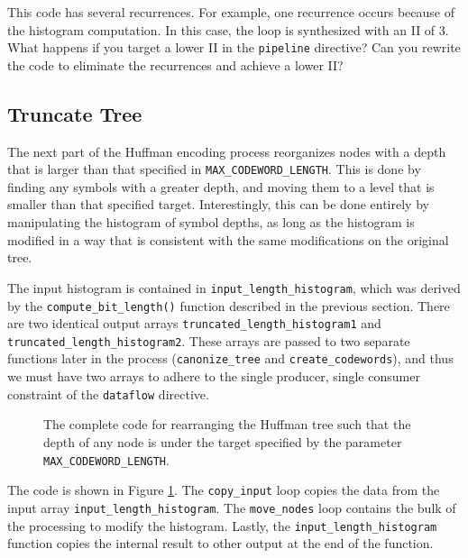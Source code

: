 \begin{exercise}
This code has several recurrences.  For example, one recurrence occurs because of the histogram computation.  In this case, the loop is synthesized with an II of 3.  What happens if you target a lower II in the \lstinline{pipeline} directive?  Can you rewrite the code to eliminate the recurrences and achieve a lower II?
\end{exercise}

\subsection{Truncate Tree}
\label{sec:huffman_truncate_tree}

The next part of the Huffman encoding process reorganizes nodes with a depth that is larger than that specified in \lstinline{MAX_CODEWORD_LENGTH}. This is done by finding any symbols with a greater depth, and moving them to a level that is smaller than that specified target.   Interestingly, this can be done entirely by manipulating the histogram of symbol depths, as long as the histogram is modified in a way that is consistent with the same modifications on the original tree.


The input histogram is contained in \lstinline{input_length_histogram}, which was derived by the \lstinline{compute_bit_length()} function described in the previous section. There are two identical output arrays \lstinline{truncated_length_histogram1} and \lstinline{truncated_length_histogram2}. These arrays are passed to two separate functions later in the process (\lstinline{canonize_tree} and \lstinline{create_codewords}), and thus we must have two arrays to adhere to the single producer, single consumer constraint of the \lstinline{dataflow} directive.

\begin{figure}

\end{figure}
\begin{figure}

\caption{The complete code for rearranging the Huffman tree such that the depth of any node is under the target specified by the parameter \lstinline{MAX_CODEWORD_LENGTH}. }
\label{fig:huffman_truncate_tree.cpp}
\end{figure}

The code is shown in Figure \ref{fig:huffman_truncate_tree.cpp}. The \lstinline{copy_input} loop copies the data from the input array \lstinline{input_length_histogram}. The \lstinline{move_nodes} loop contains the bulk of the processing to modify the histogram.  Lastly, the \lstinline{input_length_histogram} function copies the internal result to other output at the end of the function. 

